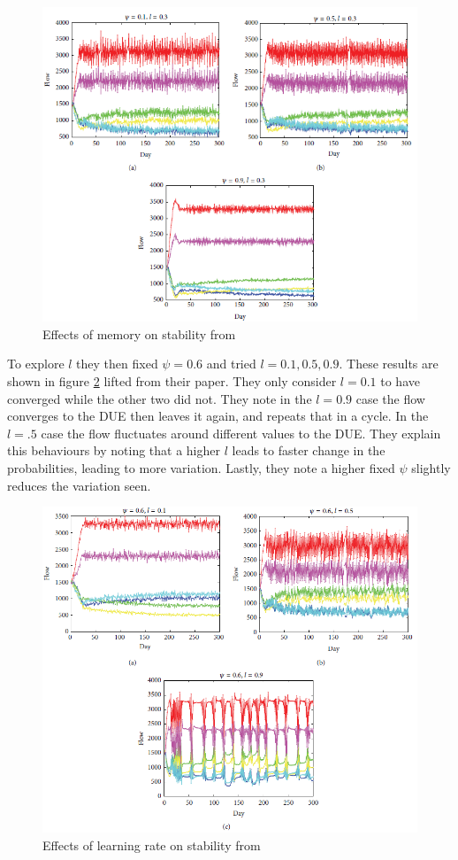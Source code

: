 \documentclass[12pt, a4paper, onecolumn]{article}
\begin{document}
 \begin{figure}[h]
	\centering
	\includegraphics[scale=1]{reinf_paper.png}
	\caption{Effects of memory on stability from \cite{Wei2014}}
	\label{fig:reinf}
	\end{figure}

 To explore $l$ they then fixed $\psi = 0.6$ and tried $l = 0.1, 0.5, 0.9$. These results are shown in figure \ref{fig:reinf2} lifted from their paper. They only consider $l = 0.1$ to have converged while the other two did not. They note in the $l = 0.9$ case the flow converges to the DUE then leaves it again, and repeats that in a cycle. In the $l=.5$ case the flow fluctuates around different values to the DUE. They explain this behaviours by noting that a higher $l$ leads to faster change in the probabilities, leading to more variation. Lastly, they note a higher fixed $\psi$ slightly reduces the variation seen.

\begin{figure}[h]
	\centering
	\includegraphics[scale=1]{reinf_paper2.png}
	\caption{Effects of learning rate on stability from \cite{Wei2014}}
	\label{fig:reinf2}
	\end{figure}
\end{document}
